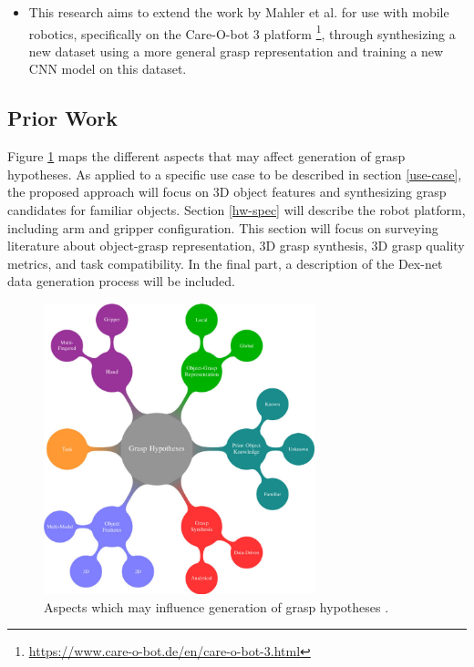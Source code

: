 \documentclass[12pt]{article}
\begin{document}
\begin{itemize}
        \item This research aims to extend the work by Mahler et al. \cite{mahler2017} for use with mobile robotics, specifically on the Care-O-bot 3 platform \footnote{\url{https://www.care-o-bot.de/en/care-o-bot-3.html}}, through synthesizing a new dataset using a more general grasp representation and training a new CNN model on this dataset.
    \end{itemize}

    \subsection{Prior Work}

    Figure \ref{fig:grasp_synthesis_mind_map} maps the different aspects that may affect generation of grasp hypotheses. As applied to a specific use case to be described in section \ref{use-case}, the proposed approach will focus on 3D object features and synthesizing grasp candidates for familiar objects. Section \ref{hw-spec} will describe the robot platform, including arm and gripper configuration. This section will focus on surveying literature about object-grasp representation, 3D grasp synthesis, 3D grasp quality metrics, and task compatibility. In the final part, a description of the Dex-net data generation process will be included.

    \begin{figure}[H]
        \centering
        \includegraphics[width=0.7\textwidth]{bohg14-grasp_synthesis_mind_map}
        \caption{Aspects which may influence generation of grasp hypotheses \cite{Bohg2014}.}
        \label{fig:grasp_synthesis_mind_map}
    \end{figure}
\end{document}
